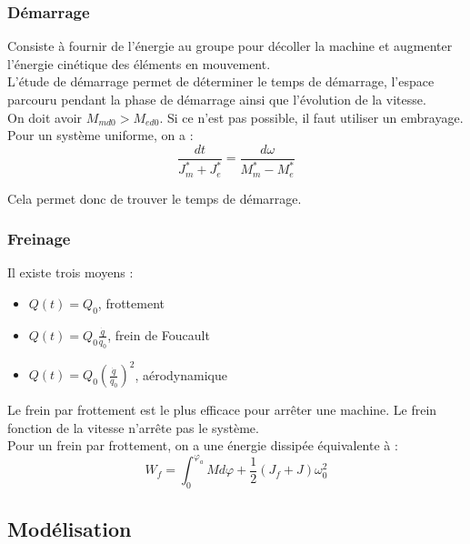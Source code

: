 \documentclass[../main.tex]{subfiles}
\begin{document}
\subsubsection{Démarrage}
Consiste à fournir de l'énergie au groupe pour décoller la machine et augmenter l'énergie cinétique des éléments en mouvement.\\
L'étude de démarrage permet de déterminer le temps de démarrage, l'espace parcouru pendant la phase de démarrage ainsi que l'évolution de la vitesse.\\

On doit avoir $M_{md0} > M_{ed0}$. Si ce n'est pas possible, il faut utiliser un embrayage.\\

Pour un système uniforme, on a : \begin{equation}
    \frac{dt}{J_m^* + J_e^*} = \frac{d \omega}{M_m^* - M_e^*}
\end{equation}

Cela permet donc de trouver le temps de démarrage.\\

\subsubsection{Freinage}
Il existe trois moyens : \begin{itemize}
    \item $Q(t) = Q_0$, frottement\\
    \item $Q(t) = Q_0 \frac{\dot{q}}{\dot{q}_0}$, frein de Foucault\\
    \item $Q(t) = Q_0 (\frac{\dot{q}}{\dot{q}_0})^2$, aérodynamique\\
\end{itemize}

Le frein par frottement est le plus efficace pour arrêter une machine. Le frein fonction de la vitesse n'arrête pas le système.\\

Pour un frein par frottement, on a une énergie dissipée équivalente à : \begin{equation}
    W_f = \int_0^{\varphi_a} M d\varphi + \frac{1}{2} (J_f + J) \omega_0^2
\end{equation}

\subsection{Modélisation}
\end{document}
